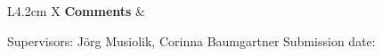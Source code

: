 \begin{titlepage}
\vspace{6mm}

\begin{minipage}{\textwidth}
\renewcommand{\arraystretch}{1.35}
\begin{tabularx}{\textwidth}{L{4.2cm} X}
\toprule
\textbf{Comments} &  \\
\bottomrule
\end{tabularx}
\end{minipage}

\vspace{8mm}
{\small Supervisors: Jörg Musiolik, Corinna Baumgartner \quad\textbar\quad Submission date: \par}

\end{titlepage}
